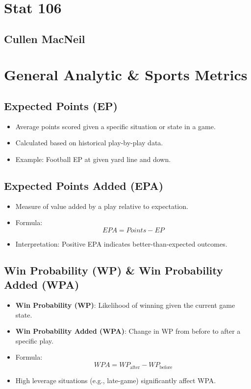 \documentclass[10pt, landscape]{article}
\begin{document}
\begin{multicols}{3}

\section{Stat 106}
\subsection{Cullen MacNeil}

\section{General Analytic \& Sports Metrics}
\subsection{Expected Points (EP)}
\begin{itemize}[noitemsep]
    \item Average points scored given a specific situation or state in a game.
    \item Calculated based on historical play-by-play data.
    \item Example: Football EP at given yard line and down.
\end{itemize}

\subsection{Expected Points Added (EPA)}
\begin{itemize}[noitemsep]
    \item Measure of value added by a play relative to expectation.
    \item Formula:
    \[ EPA = Points - EP \]
    \item Interpretation: Positive EPA indicates better-than-expected outcomes.
\end{itemize}

\subsection{Win Probability (WP) \& Win Probability Added (WPA)}
\begin{itemize}[noitemsep]
    \item \textbf{Win Probability (WP)}: Likelihood of winning given the current game state.
    \item \textbf{Win Probability Added (WPA)}: Change in WP from before to after a specific play.
    \item Formula:
    \[ WPA = WP_{\text{after}} - WP_{\text{before}} \]
    \item High leverage situations (e.g., late-game) significantly affect WPA.
\end{itemize}


\end{multicols}
\end{document}
